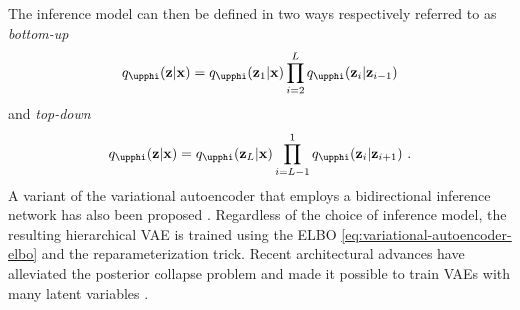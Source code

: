 The inference model can then be defined in two ways respectively referred to as \emph{bottom-up} \parencite{burda_importance_2016}
\begin{equation}
    q_\phib(\zb|\xb) = q_\phib(\zb_1|\xb)\prod_{i=2}^{L} q_\phib(\zb_i|\zb_{i-1})
\end{equation}
and \emph{top-down} \parencite{sonderby_ladder_2016}
\begin{equation}
    q_\phib(\zb|\xb) = q_\phib(\zb_L|\xb)\prod_{i=L-1}^{1} q_\phib(\zb_{i}|\zb_{i+1}) \ .
\end{equation}
A variant of the variational autoencoder that employs a bidirectional inference network has also been proposed \parencite{maaloe_biva_2019}.
Regardless of the choice of inference model, the resulting hierarchical VAE is trained using the ELBO \cref{eq:variational-autoencoder-elbo} and the reparameterization trick.
Recent architectural advances have alleviated the posterior collapse problem and made it possible to train VAEs with many latent variables \parencite{maaloe_biva_2019,vahdat_nvae_2020,child_very_2021}. 




